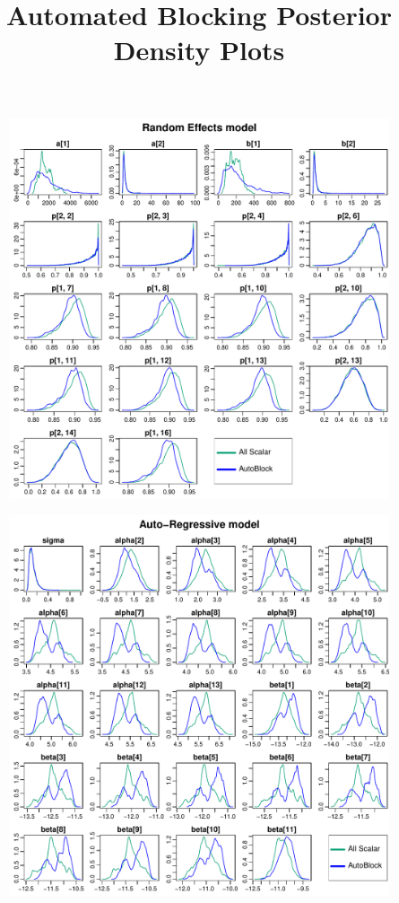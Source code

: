\documentclass{article}
\begin{document}
\title{Automated Blocking Posterior Density Plots}
\author{}
\date{}
\maketitle

\begin{figure}[h]
\centerline{\includegraphics[scale=1.0]{RandomEffectsmodel}}
\end{figure}
\thispagestyle{empty}
\clearpage

\begin{figure}[h]
\centerline{\includegraphics[scale=1.0]{AutoRegressivemodel}}
\end{figure}
\thispagestyle{empty}
\clearpage
\end{document}
